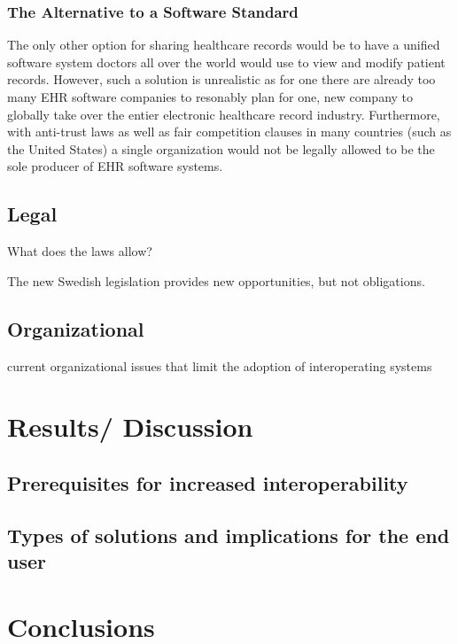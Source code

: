 \documentclass[12pt]{article}
\begin{document}
\subsubsection{The Alternative to a Software Standard}
The only other option for sharing healthcare records would be to have a unified software system doctors all over the world would use to view and modify patient records. However, such a solution is unrealistic as for one there are already too many EHR software companies to resonably plan for one, new company to globally take over the entier electronic healthcare record industry. Furthermore, with anti-trust laws as well as fair competition clauses in many countries (such as the United States) a single organization would not be legally allowed to be the sole producer of EHR software systems.



\subsection{Legal}
What does the laws allow? 

The new Swedish legislation provides new opportunities, but not obligations. \cite{RiR19}

\subsection{Organizational}
current organizational issues that limit the adoption of interoperating systems


\section{Results/ Discussion}

\subsection{ Prerequisites for increased interoperability}

\subsection{Types of solutions and implications for the end user}


\section{Conclusions}


\newpage

\begin{appendix}


\end{appendix}

\newpage

 
 
\end{document}
